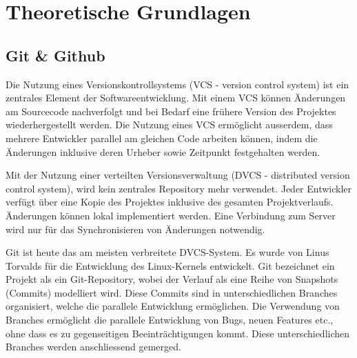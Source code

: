 


\chapter{Theoretische Grundlagen} %

\label{Chapter2} %


\section{Git \& Github}
Die Nutzung eines Versionskontrollsystems (VCS - version control system) ist ein zentrales Element der Softwareentwicklung. Mit einem VCS können Änderungen am Sourcecode nachverfolgt und bei Bedarf eine frühere Version des Projektes wiederhergestellt werden. Die Nutzung eines VCS ermöglicht ausserdem, dass mehrere Entwickler parallel am gleichen Code arbeiten können, indem die Änderungen inklusive deren Urheber sowie Zeitpunkt festgehalten werden. 

Mit der Nutzung einer verteilten Versionsverwaltung (DVCS - distributed version control system), wird kein zentrales Repository mehr verwendet. Jeder Entwickler verfügt über eine Kopie des Projektes inklusive des gesamten Projektverlaufs. Änderungen können lokal implementiert werden. Eine Verbindung zum Server wird nur für das Synchronisieren von Änderungen notwendig. \parencite{noauthor_informationen_2025} 

Git ist heute das am meisten verbreitete DVCS-System. Es wurde von Linus Torvalds für die Entwicklung des Linux-Kernels entwickelt. \parencite{zack_git_2018} Git bezeichnet ein Projekt als ein Git-Repository, wobei der Verlauf als eine Reihe von Snapshots (Commits) modelliert wird. Diese Commits sind in unterschiedlichen Branches organisiert, welche die parallele Entwicklung ermöglichen. Die Verwendung von Branches ermöglicht die parallele Entwicklung von Bugs, neuen Features etc., ohne dass es zu gegenseitigen Beeinträchtigungen kommt. Diese unterschiedlichen Branches werden anschliessend gemerged. 

